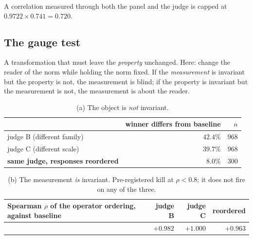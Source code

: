 \begin{corollary}
A correlation measured through both the panel and the judge is capped at
$0.9722 \times 0.741 = 0.720$.
\end{corollary}

\subsection{The gauge test}
\label{sec:gauge}

\begin{definition}
A transformation that must leave the \emph{property} unchanged. Here: change the
reader of the norm while holding the norm fixed. If the \emph{measurement} is
invariant but the property is not, the measurement is blind; if the property is
invariant but the measurement is not, the measurement is about the reader.
\end{definition}

\begin{table}[H]\centering\small
\begin{tabular}{lrr}
\toprule
& winner differs from baseline & $n$\\
\midrule
judge B (different family) & $42.4\%$ & $968$\\
judge C (different scale) & $39.7\%$ & $968$\\
\textbf{same judge, responses reordered} & $\mathbf{8.0\%}$ & $300$\\
\bottomrule
\end{tabular}
\caption{(a) The object is \emph{not} invariant.}
\label{tab:gaugea}
\end{table}

\begin{table}[H]\centering\small
\begin{tabular}{lrrr}
\toprule
Spearman $\rho$ of the operator ordering, against baseline & judge B & judge C & reordered\\
\midrule
& $+0.982$ & $+1.000$ & $+0.963$\\
\bottomrule
\end{tabular}
\caption{(b) The measurement \emph{is} invariant. Pre-registered kill at
$\rho<0.8$; it does not fire on any of the three.}
\label{tab:gaugeb}
\end{table}


